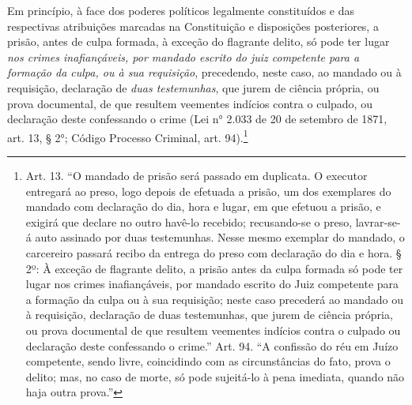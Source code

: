 \asterisc

Em princípio, à face dos poderes políticos legalmente constituídos e das
respectivas atribuições marcadas na Constituição e disposições
posteriores, a prisão, antes de culpa formada, à exceção do flagrante
delito, só pode ter lugar \emph{nos crimes inafiançáveis, por mandado
escrito do juiz competente para a formação da culpa, ou à sua
requisição}, precedendo, neste caso, ao mandado ou à requisição,
declaração de \emph{duas testemunhas}, que jurem de ciência própria, ou
prova documental, de que resultem veementes indícios contra o culpado,
ou declaração deste confessando o crime
(Lei n° 2.033 de 20 de setembro
de 1871, art. 13, § 2°; Código Processo Criminal, art.
94).\footnote{Art. 13. ``O mandado de prisão será passado em \label{art13}
  duplicata. O executor entregará ao preso, logo depois de efetuada a
  prisão, um dos exemplares do mandado com declaração do dia, hora e
  lugar, em que efetuou a prisão, e exigirá que declare no outro havê-lo
  recebido; recusando-se o preso, lavrar-se-á auto assinado por duas
  testemunhas. Nesse mesmo exemplar do mandado, o carcereiro passará
  recibo da entrega do preso com declaração do dia e hora. § 2º: À
  exceção de flagrante delito, a prisão antes da culpa formada só pode
  ter lugar nos crimes inafiançáveis, por mandado escrito do Juiz
  competente para a formação da culpa ou à sua requisição; neste caso
  precederá ao mandado ou à requisição, declaração de duas testemunhas,
  que jurem de ciência própria, ou prova documental de que resultem
  veementes indícios contra o culpado ou declaração deste confessando o
  crime.'' Art. 94. ``A confissão do réu em Juízo competente, sendo
  livre, coincidindo com as circunstâncias do fato, prova o delito; mas,
  no caso de morte, só pode sujeitá-lo à pena imediata, quando não haja
  outra prova.''}

